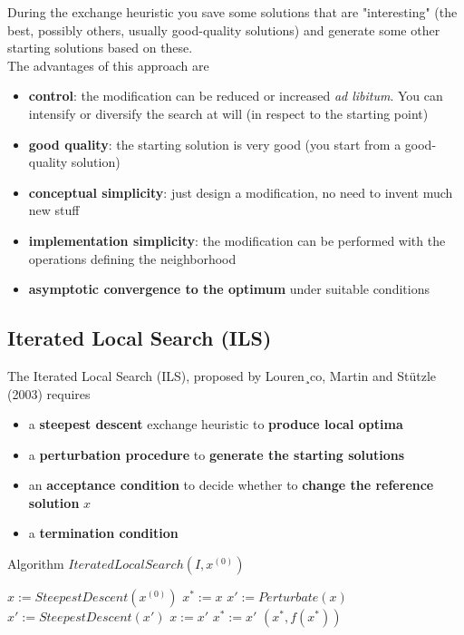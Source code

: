 During the exchange heuristic you save some solutions that are "interesting" (the best, possibly others, usually good-quality solutions) and generate some other starting solutions based on these.\\ 

The advantages of this approach are
\begin{itemize}
	\item \textbf{control}: the modification can be reduced or increased \textit{ad libitum}. You can intensify or diversify the search at will (in respect to the starting point)
	
	\item \textbf{good quality}: the starting solution is very good (you start from a good-quality solution)
	
	\item \textbf{conceptual simplicity}: just design a modification, no need to invent much new stuff
	
	\item \textbf{implementation simplicity}: the modification can be performed with the operations defining the neighborhood
	
	\item \textbf{asymptotic convergence to the optimum} under suitable conditions
\end{itemize}

\newpage

\subsection{Iterated Local Search (ILS)}

The Iterated Local Search (ILS), proposed by Louren¸co, Martin and St\"utzle (2003) requires
\begin{itemize}
	\item a \textbf{steepest descent} exchange heuristic to \textbf{produce local optima}
	
	\item a \textbf{perturbation procedure} to \textbf{generate the starting solutions}
	
	\item an \textbf{acceptance condition} to decide whether to \textbf{change the reference solution} $x$
	
	\item a \textbf{termination condition}
\end{itemize}

\begin{algorithm}
	\caption{Algorithm $IteratedLocalSearch(I , x^{(0)})$}
	\begin{algorithmic}
		\STATE $x := SteepestDescent(x^{(0)})$
		\STATE $x^\ast := x$
		\STATE $x' := Perturbate(x)$
		\STATE $x' := SteepestDescent(x')$
		\STATE $x := x'$
		\ENDIF
		\STATE $x^\ast := x'$
		\ENDIF
		\ENDFOR
		\RETURN $(x^\ast, f (x^\ast))$
	\end{algorithmic}
\end{algorithm}

